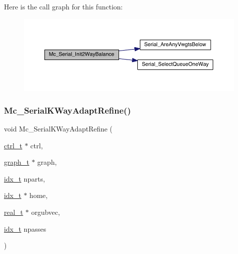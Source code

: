 Here is the call graph for this function\+:\nopagebreak
\begin{figure}[H]
\begin{center}
\leavevmode
\includegraphics[width=350pt]{a00407_ad376cf99d1d14ec6aeecf466359ce898_cgraph}
\end{center}
\end{figure}
\mbox{\label{a00407_a8aad6fc44513e8a6ff7e151c231f98ce}} 
\subsubsection{\texorpdfstring{Mc\+\_\+\+Serial\+K\+Way\+Adapt\+Refine()}{Mc\_SerialKWayAdaptRefine()}}
{\footnotesize\ttfamily void Mc\+\_\+\+Serial\+K\+Way\+Adapt\+Refine (\begin{DoxyParamCaption}\item[{\hyperlink{a00742}{ctrl\+\_\+t} $\ast$}]{ctrl,  }\item[{\hyperlink{a00734}{graph\+\_\+t} $\ast$}]{graph,  }\item[{\hyperlink{a00876_aaa5262be3e700770163401acb0150f52}{idx\+\_\+t}}]{nparts,  }\item[{\hyperlink{a00876_aaa5262be3e700770163401acb0150f52}{idx\+\_\+t} $\ast$}]{home,  }\item[{\hyperlink{a00876_a1924a4f6907cc3833213aba1f07fcbe9}{real\+\_\+t} $\ast$}]{orgubvec,  }\item[{\hyperlink{a00876_aaa5262be3e700770163401acb0150f52}{idx\+\_\+t}}]{npasses }\end{DoxyParamCaption})}

